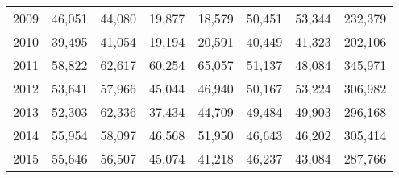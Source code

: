 \documentclass[]{article}
\begin{document}
\begin{table}[ht]
\begin{tabular}{crrrrrrr}
2009    &   46,051  &   44,080  &   19,877  &   18,579  &   50,451  &   53,344  &   232,379 \\
2010    &   39,495  &   41,054  &   19,194  &   20,591  &   40,449  &   41,323  &   202,106 \\
2011    &   58,822  &   62,617  &   60,254  &   65,057  &   51,137  &   48,084  &   345,971 \\
2012    &   53,641  &   57,966  &   45,044  &   46,940  &   50,167  &   53,224  &   306,982 \\
2013    &   52,303  &   62,336  &   37,434  &   44,709  &   49,484  &   49,903  &   296,168 \\
2014    &   55,954  &   58,097  &   46,568  &   51,950  &   46,643  &   46,202  &   305,414 \\
2015    &   55,646  &   56,507  &   45,074  &   41,218  &   46,237  &   43,084  &   287,766 \\
  \hline
\end{tabular}
\end{table}

\clearpage
\end{document}
